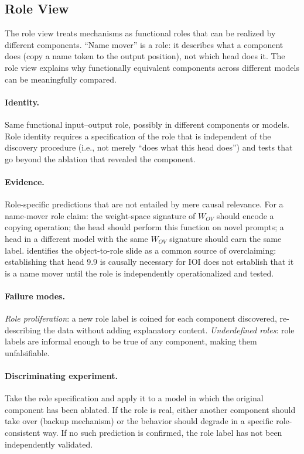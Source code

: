 \documentclass[11pt]{article}
\theoremstyle{remark}
\begin{document}
\subsection{Role View}

The role view treats mechanisms as functional roles that can be realized
by different components.  ``Name mover'' is a role: it describes what a
component does (copy a name token to the output position), not which head
does it.  The role view explains why functionally equivalent components
across different models can be meaningfully compared.

\paragraph{Identity.}
Same functional input--output role, possibly in different components or
models.  Role identity requires a specification of the role that is
independent of the discovery procedure (i.e., not merely ``does what
this head does'') and tests that go beyond the ablation that revealed
the component.

\paragraph{Evidence.}
Role-specific predictions that are not entailed by mere causal relevance.
For a name-mover role claim: the weight-space signature of $W_{OV}$
should encode a copying operation; the head should perform this function
on novel prompts; a head in a different model with the same $W_{OV}$
signature should earn the same label.  \citet{tower2026mechval} identifies
the object-to-role slide as a common source of overclaiming: establishing
that head 9.9 is causally necessary for IOI does not establish that it
is a name mover until the role is independently operationalized and tested.

\paragraph{Failure modes.}
\emph{Role proliferation}: a new role label is coined for each component
discovered, re-describing the data without adding explanatory content.
\emph{Underdefined roles}: role labels are informal enough to be true of
any component, making them unfalsifiable.

\paragraph{Discriminating experiment.}
Take the role specification and apply it to a model in which the
original component has been ablated.  If the role is real, either another
component should take over (backup mechanism) or the behavior should
degrade in a specific role-consistent way.  If no such prediction is
confirmed, the role label has not been independently validated.
\end{document}
